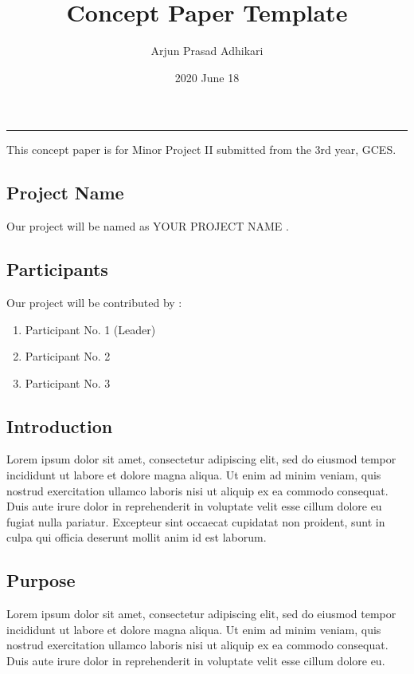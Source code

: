\documentclass[a4paper, 12pt]{report}
\title{Concept Paper Template}
\author{Arjun Prasad Adhikari}
\date{2020 June 18}
\begin{document}
	\chapter*{}
	\hrule
	\vspace{2cm}
	
	This concept paper is for Minor Project II submitted from the 3rd year, GCES.
	\vspace{0.3cm}
	
	
	\section*{Project Name}
	Our project will be named as YOUR PROJECT NAME .
	\vspace{0.5cm}
	
	\section*{Participants}
	Our project will be contributed by :
	\begin{enumerate}
		\item Participant No. 1 (Leader)
		\item Participant No. 2
		\item Participant No. 3
	\end{enumerate}
	\vspace{0.5cm}


	\section*{Introduction}
	Lorem ipsum dolor sit amet, consectetur adipiscing elit, sed do eiusmod tempor incididunt ut labore et dolore magna aliqua. Ut enim ad minim veniam, quis nostrud exercitation ullamco laboris nisi ut aliquip ex ea commodo consequat. Duis aute irure dolor in reprehenderit in voluptate velit esse cillum dolore eu fugiat nulla pariatur. Excepteur sint occaecat cupidatat non proident, sunt in culpa qui officia deserunt mollit anim id est laborum.
	\vspace{0.5cm}
	
	
	\section*{Purpose}
	Lorem ipsum dolor sit amet, consectetur adipiscing elit, sed do eiusmod tempor incididunt ut labore et dolore magna aliqua. Ut enim ad minim veniam, quis nostrud exercitation ullamco laboris nisi ut aliquip ex ea commodo consequat. Duis aute irure dolor in reprehenderit in voluptate velit esse cillum dolore eu.
	\vspace{0.5cm}
	
\end{document}
